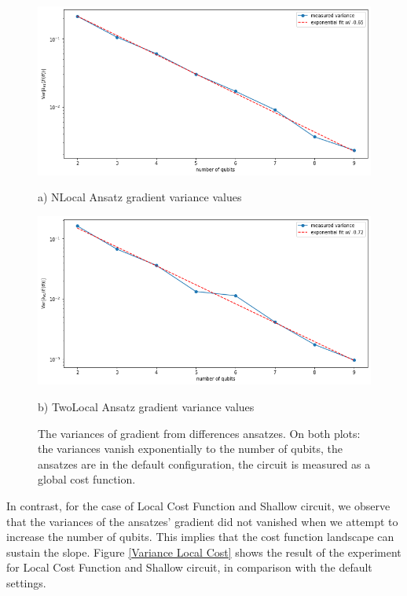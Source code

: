 \begin{figure}
    \includegraphics[width=\textwidth]{Artefact/Appendices/NLocalDefault.png}
    \centerline{a) NLocal Ansatz gradient variance values}
    \includegraphics[width=\textwidth]{Artefact/Appendices/TwoLocalDefault.png}
    \centerline{b) TwoLocal Ansatz gradient variance values}
    \caption{
        The variances of gradient from differences ansatzes.
        On both plots: the variances vanish exponentially to the number of qubits, the ansatzes are in the default configuration, the circuit is measured as a global cost function.
    }
    \label{Plot ansatzes gradients default}
\end{figure}

In contrast, for the case of Local Cost Function and Shallow circuit, we observe that the variances of the ansatzes' gradient did not vanished when we attempt to increase the number of qubits.
This implies that the cost function landscape can sustain the slope.
Figure \ref{Variance Local Cost} shows the result of the experiment for Local Cost Function and Shallow circuit, in comparison with the default settings.

